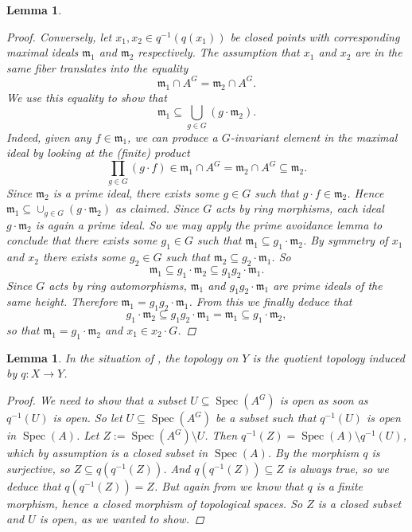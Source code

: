 \documentclass[12pt,a4paper]{amsart}
\theoremstyle{plain}
\newtheorem{lm}[thm]{Lemma}
\theoremstyle{definition}
\theoremstyle{remark}
\begin{document}
\begin{lm}
\begin{proof}
    Conversely, let $x_{1}, x_{2} \in q^{-1}(q(x_{1}))$ be closed points with corresponding maximal ideals $\mathfrak{m}_{1}$ and $\mathfrak{m}_{2}$ respectively.
    The assumption that $x_{1}$ and $x_{2}$ are in the same fiber translates into the equality
    \[ \mathfrak{m}_{1} \cap A^{G} = \mathfrak{m}_{2} \cap A^{G}. \]
    We use this equality to show that
    \[ \mathfrak{m}_{1} \subseteq \bigcup_{g \in G} (g \cdot \mathfrak{m}_{2}). \]
    Indeed, given any $f \in \mathfrak{m}_{1}$, we can produce a $G$-invariant element in the maximal ideal by looking at the (finite) product
    \[ \prod_{g \in G} (g \cdot f) \in \mathfrak{m}_{1} \cap A^{G} = \mathfrak{m}_{2} \cap A^{G} \subseteq \mathfrak{m}_{2}. \]
    Since $\mathfrak{m}_{2}$ is a prime ideal, there exists some $g \in G$ such that $g \cdot f \in \mathfrak{m}_{2}$.
    Hence $\mathfrak{m}_{1} \subseteq \cup_{g \in G} (g \cdot \mathfrak{m}_{2})$ as claimed.
    Since $G$ acts by ring morphisms, each ideal $g \cdot \mathfrak{m}_{2}$ is again a prime ideal.
    So we may apply the prime avoidance lemma to conclude that there exists some $g_{1} \in G$ such that $\mathfrak{m}_{1} \subseteq g_{1} \cdot \mathfrak{m}_{2}$.
    By symmetry of $x_{1}$ and $x_{2}$ there exists some $g_{2} \in G$ such that $\mathfrak{m}_{2} \subseteq g_{2} \cdot \mathfrak{m}_{1}$.
    So
    \[ \mathfrak{m}_{1} \subseteq g_{1} \cdot \mathfrak{m}_{2} \subseteq g_{1} g_{2} \cdot \mathfrak{m}_{1}. \]
    Since $G$ acts by ring automorphisms, $\mathfrak{m}_{1}$ and $g_{1} g_{2} \cdot \mathfrak{m}_{1}$ are prime ideals of the same height.
    Therefore $\mathfrak{m}_{1} = g_{1} g_{2} \cdot \mathfrak{m}_{1}$.
    From this we finally deduce that
    \[ g_{1} \cdot \mathfrak{m}_{2} \subseteq g_{1}g_{2} \cdot \mathfrak{m}_{1} = \mathfrak{m}_{1} \subseteq g_{1} \cdot \mathfrak{m}_{2}, \]
    so that $\mathfrak{m}_{1} = g_{1} \cdot \mathfrak{m}_{2}$ and $x_{1} \in x_{2} \cdot G$.
  \end{proof}
\end{lm}

\begin{lm}\label{lm:topology}
  In the situation of , the topology on $Y$ is the quotient topology induced by $q \colon X \to Y$.
  
  \begin{proof}
    We need to show that a subset $U \subseteq \operatorname{Spec}(A^{G})$ is open as soon as $q^{-1}(U)$ is open.
    So let $U \subseteq \operatorname{Spec}(A^{G})$ be a subset such that $q^{-1}(U)$ is open in $\operatorname{Spec}(A)$.
    Let $Z := \operatorname{Spec}(A^{G}) \setminus U$.
    Then $q^{-1}(Z) = \operatorname{Spec}(A) \setminus q^{-1}(U)$, which by assumption is a closed subset in $\operatorname{Spec}(A)$.
    By  the morphism $q$ is surjective, so $Z \subseteq q(q^{-1}(Z))$.
    And $q(q^{-1}(Z)) \subseteq Z$ is always true, so we deduce that $q(q^{-1}(Z)) = Z$.
    But again from  we know that $q$ is a finite morphism, hence a closed morphism of topological spaces.
    So $Z$ is a closed subset and $U$ is open, as we wanted to show.
  \end{proof}
\end{lm}
\end{document}
